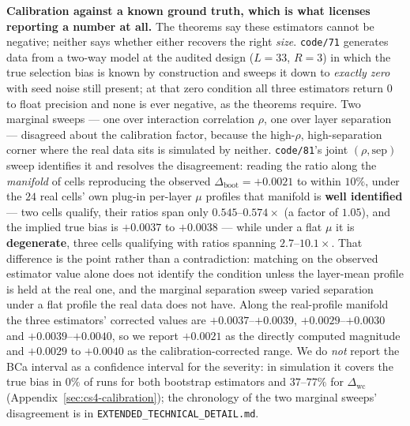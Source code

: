 \documentclass[10pt]{article} %
\begin{document}
\textbf{Calibration against a known ground truth, which is what licenses
reporting a number at all.} The theorems say these estimators cannot be
negative; neither says whether either recovers the right \emph{size}.
\texttt{code/71} generates data from a two-way model at the audited design
($L=33$, $R=3$) in which the true selection bias is known by construction and
sweeps it down to \emph{exactly zero} with seed noise still present; at that
zero condition all three estimators return $0$ to float precision and none is
ever negative, as the theorems require. Two marginal sweeps --- one over
interaction correlation $\rho$, one over layer separation --- disagreed about
the calibration factor, because the high-$\rho$, high-separation corner where
the real data sits is simulated by neither. \texttt{code/81}'s joint
$(\rho,\text{sep})$ sweep identifies it and resolves the disagreement: reading
the ratio along the \emph{manifold} of cells reproducing the observed
$\Delta_{\text{boot}}=+0.0021$ to within $10\%$, under the $24$ real cells' own
plug-in per-layer $\mu$ profiles that manifold is \textbf{well identified} ---
two cells qualify, their ratios span only $0.545$--$0.574\times$ (a factor of
$1.05$), and the implied true bias is $+0.0037$ to $+0.0038$ --- while under a
flat $\mu$ it is \textbf{degenerate}, three cells qualifying with ratios
spanning $2.7$--$10.1\times$. That difference is the point rather than a
contradiction: matching on the observed estimator value alone does not identify
the condition unless the layer-mean profile is held at the real one, and the
marginal separation sweep varied separation under a flat profile the real data
does not have. Along the real-profile manifold the three estimators' corrected
values are $+0.0037$--$+0.0039$, $+0.0029$--$+0.0030$ and $+0.0039$--$+0.0040$,
so we report $+0.0021$ as the directly computed magnitude and $+0.0029$ to
$+0.0040$ as the calibration-corrected range. We do \emph{not} report the BCa
interval as a confidence interval for the severity: in simulation it covers the
true bias in $0\%$ of runs for both bootstrap estimators and $37$--$77\%$ for
$\Delta_{\text{wc}}$ (Appendix~\ref{sec:cs4-calibration}); the chronology of
the two marginal sweeps' disagreement is in
\texttt{EXTENDED\_TECHNICAL\_DETAIL.md}.
\end{document}

